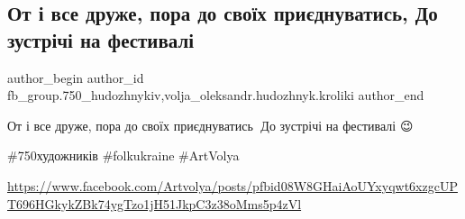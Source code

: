  
 
 
 
 

\subsection{От і все друже, пора до своїх приєднуватись, До зустрічі на фестивалі}
\label{sec:27_03_2018.fb.fb_group.750_hudozhnykiv.1.ot_i_vse_druzhe_pora_do_svoih_pryjednuvatys}
 
\ifcmt
 author_begin
   author_id fb_group.750_hudozhnykiv,volja_oleksandr.hudozhnyk.kroliki
 author_end
\fi

От і все друже, пора до своїх приєднуватись🐰 До зустрічі на фестивалі 😉

\#750художників \#folkukraine \#ArtVolya

\url{https://www.facebook.com/Artvolya/posts/pfbid08W8GHaiAoUYxyqwt6xzgcUPT696HGkykZBk74ygTzo1jH51JkpC3z38oMms5p4zVl}
